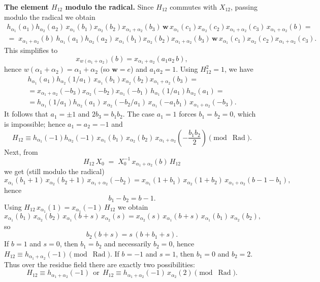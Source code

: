 \documentclass[]{jgcc}
\DeclareMathOperator{\Rad}{Rad}
\numberwithin{equation}{section}
\begin{document}
\noindent\textbf{The element $H_{12}$ modulo the radical.}
Since $H_{12}$ commutes with $X_{12}$, passing modulo the radical we obtain
\begin{multline*}
h_{\alpha_1}(a_1)h_{\alpha_2}(a_2)\,
x_{\alpha_1}(b_1)x_{\alpha_2}(b_2)x_{\alpha_1+\alpha_2}(b_3)\,
\mathbf w\,
x_{\alpha_1}(c_1)x_{\alpha_2}(c_2)x_{\alpha_1+\alpha_2}(c_3)\,
x_{\alpha_1+\alpha_2}(b)=\\
=\;
x_{\alpha_1+\alpha_2}(b)\,
h_{\alpha_1}(a_1)h_{\alpha_2}(a_2)\,
x_{\alpha_1}(b_1)x_{\alpha_2}(b_2)x_{\alpha_1+\alpha_2}(b_3)\,
\mathbf w\,
x_{\alpha_1}(c_1)x_{\alpha_2}(c_2)x_{\alpha_1+\alpha_2}(c_3).
\end{multline*}
This simplifies to
\[
x_{w(\alpha_1+\alpha_2)}(b)=x_{\alpha_1+\alpha_2}(a_1a_2\,b),
\]
hence $w(\alpha_1+\alpha_2)=\alpha_1+\alpha_2$ (so $\mathbf w=e$) and $a_1a_2=1$.
Using $H_{12}^2=1$, we have
\begin{multline*}
h_{\alpha_1}(a_1)h_{\alpha_2}(1/a_1)\,x_{\alpha_1}(b_1)x_{\alpha_2}(b_2)x_{\alpha_1+\alpha_2}(b_3)=\\
= x_{\alpha_1+\alpha_2}(-b_3)x_{\alpha_2}(-b_2)x_{\alpha_1}(-b_1)\,h_{\alpha_1}(1/a_1)h_{\alpha_2}(a_1)=\\
= h_{\alpha_1}(1/a_1)h_{\alpha_2}(a_1)\,x_{\alpha_2}(-b_2/a_1)\,x_{\alpha_1}(-a_1b_1)\,x_{\alpha_1+\alpha_2}(-b_3).
\end{multline*}
It follows that $a_1=\pm 1$ and $2b_3=b_1b_2$.
The case $a_1=1$ forces $b_1=b_2=0$, which is impossible; hence $a_1=a_2=-1$ and
\[
H_{12}\equiv h_{\alpha_1}(-1)h_{\alpha_2}(-1)\,x_{\alpha_1}(b_1)\,x_{\alpha_2}(b_2)\,x_{\alpha_1+\alpha_2}\!\left(-\frac{b_1b_2}{2}\right)\pmod{\Rad}.
\]
Next, from
\[
H_{12}\,X_0 \;=\; X_0^{-1}\,x_{\alpha_1+\alpha_2}(b)\,H_{12}
\]
we get (still modulo the radical)
\[
x_{\alpha_1}(b_1{+}1)\,x_{\alpha_2}(b_2{+}1)\,x_{\alpha_1+\alpha_2}(-b_2)
=
x_{\alpha_1}(1{+}b_1)\,x_{\alpha_2}(1{+}b_2)\,x_{\alpha_1+\alpha_2}(b-1-b_1),
\]
hence
\[
b_1-b_2=b-1.
\]
Using $H_{12}\,x_{\alpha_1}(1)=x_{\alpha_1}(-1)\,H_{12}$ we obtain
\[
x_{\alpha_1}(b_1)\,x_{\alpha_2}(b_2)\,x_{\alpha_1}(b+s)\,x_{\alpha_2}(s)
=
x_{\alpha_2}(s)\,x_{\alpha_1}(b+s)\,x_{\alpha_1}(b_1)\,x_{\alpha_2}(b_2),
\]
so
\[
b_2(b+s)=s\,(b+b_1+s).
\]
If $b=1$ and $s=0$, then $b_1=b_2$ and necessarily $b_2=0$, hence $H_{12}\equiv h_{\alpha_1+\alpha_2}(-1)\pmod{\Rad}$.
If $b=-1$ and $s=1$, then $b_1=0$ and $b_2=2$.
Thus over the residue field there are exactly two possibilities:
\[
H_{12}\equiv h_{\alpha_1+\alpha_2}(-1)\ \ \text{or}\ \ H_{12}\equiv h_{\alpha_1+\alpha_2}(-1)\,x_{\alpha_2}(2)\pmod{\Rad}.
\]
\end{document}
